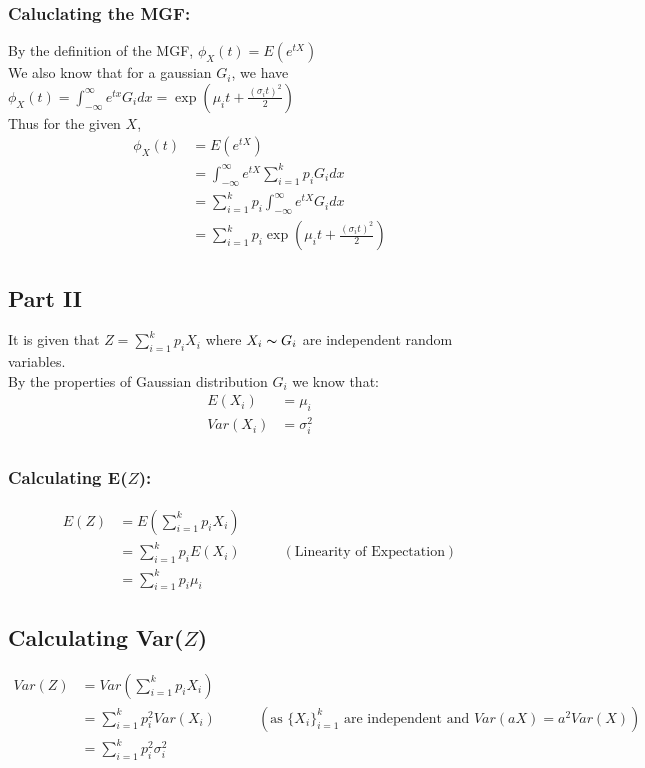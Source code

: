 \documentclass[11pt, fleqn]{article}
\begin{document}
\subsubsection*{Caluclating the MGF:}
By the definition of the MGF, $\phi_X (t) = E(e^{tX})$\\
We also know that for a gaussian $G_i$, we have $\phi_X (t) = \int_{-\infty}^{\infty}e^{tx} G_i dx = \exp(\mu_i t + \frac{(\sigma_i t)^2}{2})$\\
Thus for the given $X$,
$$
\begin{aligned}
    \phi_X (t) &= E(e^{tX}) \\
    &= \int_{-\infty}^{\infty}e^{tX} \sum_{i=1}^{k}p_i G_i dx\\
    &= \sum_{i=1}^{k}p_i \int_{-\infty}^{\infty}e^{tX} G_i dx\\
    &= \boxed{\sum_{i=1}^{k}p_i\exp(\mu_i t + \frac{(\sigma_i t)^2}{2})}
\end{aligned}
$$
\subsection*{Part II}
It is given that $Z = \sum_{i=1}^{k}p_iX_i $ where $X_i \thicksim G_i$ are independent random variables.\\
By the properties of Gaussian distribution $G_i$ we know that:\\
$$
\begin{aligned}
E(X_i) &= \mu_i\\
Var(X_i) &= \sigma_i^2\\
\end{aligned}
$$
\subsubsection*{Calculating E($Z$):}
$$
\begin{aligned}
    E(Z) &= E( \sum_{i=1}^{k}p_iX_i)\\
    &= \sum_{i=1}^{k}p_i E(X_i) \hspace{3em} (\text{Linearity of Expectation})\\
    &= \boxed{ \sum_{i=1}^{k}p_i\mu_i }
\end{aligned}
$$
\subsection*{Calculating Var($Z$)}
$$
\begin{aligned}
    Var(Z) &= Var( \sum_{i=1}^{k}p_iX_i)\\
    &= \sum_{i=1}^{k}p_i^2 Var(X_i) \hspace{3em} (\text{as $\{ X_i\}_{i=1}^k$ are independent and $Var(aX) = a^2Var(X)$})\\
    &= \boxed{ \sum_{i=1}^{k}p_i^2\sigma_i^2 }
\end{aligned}
$$
\end{document}
